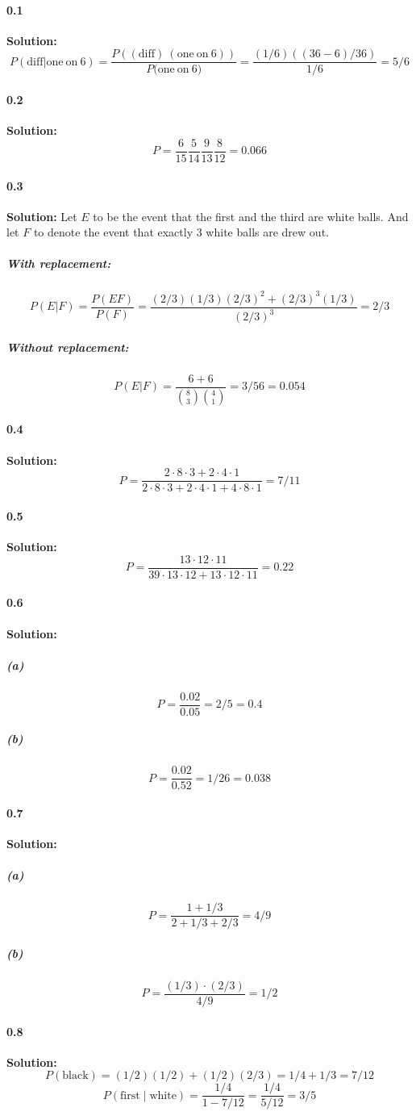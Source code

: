 \documentclass[11pt]{article}
\begin{document}
	\paragraph{0.1}\textbf{Solution:}
		\[P(\mathrm{diff} | \mathrm{one\ on\ 6}) = \frac{P((\mathrm{diff})\ (\mathrm{one\ on\ 6}))}{P(\mathrm{one\ on\ 6)}} = \frac{(1/6)((36 - 6)/36)}{1/6} = 5/6\]
	\paragraph{0.2}\textbf{Solution:} \[P = \frac{6}{15}\frac{5}{14} \frac{9}{13} \frac{8}{12} = 0.066\]
	\paragraph{0.3}\textbf{Solution:} Let $E$ to be the event that the first and the third are white balls. And let $F$ to denote the event that exactly 3 white balls are drew out.
			\subparagraph{With replacement:} 
				\[P(E | F) = \frac{P(EF)}{P(F)} = \frac{(2/3)(1/3)(2/3)^2 + (2/3)^3(1/3)}{(2/3)^3} = 2/3\]
			\subparagraph{Without replacement:}
				\[P(E | F) = \frac{6 + 6}{\binom{8}{3} \binom{4}{1}} = 3/56 = 0.054\]
	\paragraph{0.4}\textbf{Solution:}
		\[P = \frac{2\cdot 8 \cdot 3 + 2 \cdot 4 \cdot 1}{2\cdot 8 \cdot 3 + 2 \cdot 4 \cdot 1 + 4 \cdot 8 \cdot 1} = 7/11\]
	\paragraph{0.5}\textbf{Solution:}
		\[P = \frac{13 \cdot 12 \cdot 11}{39 \cdot 13 \cdot 12 + 13 \cdot 12 \cdot 11} = 0.22\]
	\paragraph{0.6}\textbf{Solution:}
		\subparagraph{(a)}
			\[P = \frac{0.02}{0.05} = 2/5 = 0.4\]
		\subparagraph{(b)}
			\[P = \frac{0.02}{0.52} = 1/26 = 0.038\]
	\paragraph{0.7}\textbf{Solution:}
		\subparagraph{(a)}
			\[P = \frac{1 + 1/3}{2 + 1/3 + 2/3} = 4/9\]
		\subparagraph{(b)}
			\[P = \frac{(1/3) \cdot (2/3)}{4/9} = 1/2\]
	\paragraph{0.8}\textbf{Solution:}
			\[P(\mathrm{black}) = (1/2)(1/2) + (1/2)(2/3) = 1/4 + 1/3 = 7/12\]
		\[P(\mathrm{first} \mid \mathrm{white}) = \frac{1/4}{1 - 7/12} = \frac{1/4}{5/12} = 3/5\]
\end{document}

